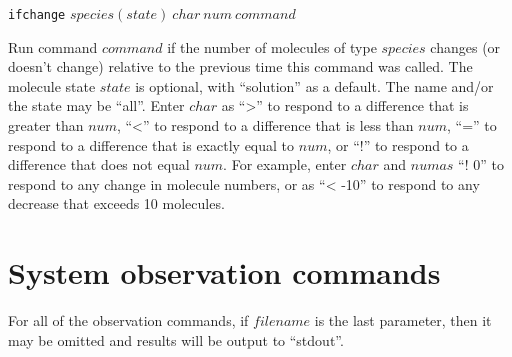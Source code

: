 \documentclass {book}
\newcommand {\ttt} {\texttt}
\begin{document}
\begin{description}
\item{\ttt{ifchange} $species(state)\ char\ num\ command$}

Run command $command$ if the number of molecules of type $species$ changes (or doesn't change) relative to the previous time this command was called. The molecule state $state$ is optional, with ``solution'' as a default. The name and/or the state may be ``all''. Enter $char$ as ``>'' to respond to a difference that is greater than $num$, ``<'' to respond to a difference that is less than $num$, ``='' to respond to a difference that is exactly equal to $num$, or ``!'' to respond to a difference that does not equal $num$. For example, enter $char$ and $num as$ ``! 0'' to respond to any change in molecule numbers, or as ``< -10'' to respond to any decrease that exceeds 10 molecules.

\end{description}

\section{System observation commands}

For all of the observation commands, if $filename$ is the last parameter, then it may be omitted and results will be output to ``stdout''.
\end{document}
